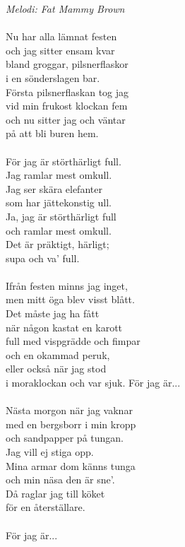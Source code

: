 {\footnotesize\textit{Melodi: Fat Mammy Brown}}\\
\\
Nu har alla lämnat festen\\
och jag sitter ensam kvar\\
bland groggar, pilsnerflaskor\\
i en sönderslagen bar.\\
Första pilsnerflaskan tog jag\\
vid min frukost klockan fem\\
och nu sitter jag och väntar\\
på att bli buren hem.\\
\\
För jag är störthärligt full.\\
Jag ramlar mest omkull.\\
Jag ser skära elefanter \\
som har jättekonstig ull.\\
Ja, jag är störthärligt full\\
och ramlar mest omkull.\\
Det är präktigt, härligt;\\
supa och va' full.\\
\\
Ifrån festen minns jag inget,\\
men mitt öga blev visst blått.\\
Det måste jag ha fått\\
när någon kastat en karott\\
full med vispgrädde och fimpar\\
och en okammad peruk,\\
eller också när jag stod\\
i moraklockan och var sjuk.
\newpage
För jag är...\\
\\
Nästa morgon när jag vaknar\\
med en bergsborr i min kropp\\
och sandpapper på tungan.\\
Jag vill ej stiga opp.\\
Mina armar dom känns tunga\\
och min näsa den är sne'.\\
Då raglar jag till köket\\
för en återställare.\\
\\
För jag är...
